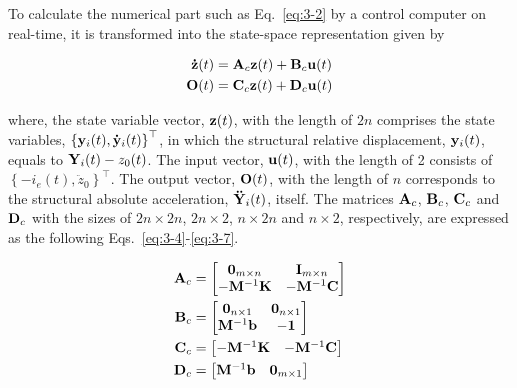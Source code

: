 To calculate the numerical part such as Eq.~\eqref{eq:3-2} by a control computer on real-time, it is transformed into the state-space representation given by

\begin{equation}\label{eq:3-3}
\begin{aligned}
\mathbf{\dot{z}}(t)&=\mathbf{A}_{c}\mathbf{z}(t)+\mathbf{B}_{c}\mathbf{u}(t)\\
\mathbf{O}(t)&=\mathbf{C}_{c}\mathbf{z}(t)+\mathbf{D}_{c}\mathbf{u}(t)
\end{aligned}
\end{equation}

where, the state variable vector, $\mathbf{z}(t)$, with the length of $2n$ comprises the state variables, $\left\{\mathbf{y}_{i}(t),\mathbf{\dot{y}}_{i}(t)\right\}^{\top}$, in which the structural relative displacement, $\mathbf{y}_{i}(t)$, equals to $\mathbf{Y}_{i}(t)-z_{0}(t)$. The input vector, $\mathbf{u}(t)$, with the length of 2 consists of $\left\{-i_{e}(t), \ddot{z}_{0}\right\}^{\top}$. The output vector, $\mathbf{O}(t)$, with the length of $n$ corresponds to the structural absolute acceleration, $\mathbf{\ddot{Y}}_{i}(t)$, itself. The matrices $\mathbf{A}_{c}$, $\mathbf{B}_{c}$, $\mathbf{C}_{c}$ and $\mathbf{D}_{c}$ with the sizes of $2n \times 2n$, $2n \times 2$, $n \times 2n$ and $n \times 2$, respectively, are expressed as the following Eqs.~\eqref{eq:3-4}-\eqref{eq:3-7}.

\begin{align}
\mathbf{A}_{c}&=\begin{bmatrix} \mathbf{0}_{m\times n}&\mathbf{I}_{m \times n}\\-\mathbf{M}^{-1}\mathbf{K}&-\mathbf{M}^{-1}\mathbf{C}\end{bmatrix} \label{eq:3-4}\\
\mathbf{B}_{c}&=\begin{bmatrix} \mathbf{0}_{n\times 1}&\mathbf{0}_{n\times 1}\\ \mathbf{M}^{-1}\mathbf{b}&\mathbf{-1}\end{bmatrix} \label{eq:3-5}\\
\mathbf{C}_{c}&=\begin{bmatrix} -\mathbf{M}^{-1}\mathbf{K}&-\mathbf{M}^{-1}\mathbf{C}\end{bmatrix} \label{eq:3-6}\\
\mathbf{D}_{c}&=\begin{bmatrix} \mathbf{M}^{-1}\mathbf{b}&\mathbf{0}_{m \times 1}\end{bmatrix} \label{eq:3-7}
\end{align}


